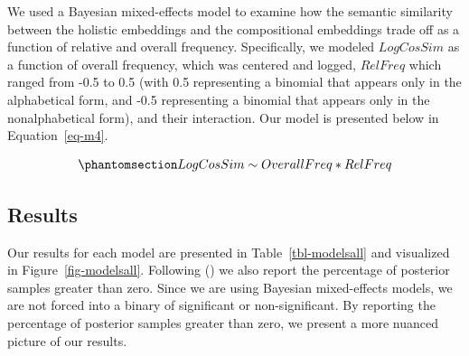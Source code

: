 \documentclass[
  12pt,
  letterpaper,
]{scrreprt}
\begin{document}
We used a Bayesian mixed-effects model to examine how the semantic
similarity between the holistic embeddings and the compositional
embeddings trade off as a function of relative and overall frequency.
Specifically, we modeled \(LogCosSim\) as a function of overall
frequency, which was centered and logged, \(RelFreq\) which ranged from
-0.5 to 0.5 (with 0.5 representing a binomial that appears only in the
alphabetical form, and -0.5 representing a binomial that appears only in
the nonalphabetical form), and their interaction. Our model is presented
below in Equation~\ref{eq-m4}.

\begin{equation}\phantomsection\label{eq-m4}{
LogCosSim \sim OverallFreq*RelFreq
}\end{equation}

\subsection{Results}\label{results-8}

Our results for each model are presented in Table~\ref{tbl-modelsall}
and visualized in Figure~\ref{fig-modelsall}. Following
() we also report the percentage of posterior samples
greater than zero. Since we are using Bayesian mixed-effects models, we
are not forced into a binary of significant or non-significant. By
reporting the percentage of posterior samples greater than zero, we
present a more nuanced picture of our results.
\end{document}
